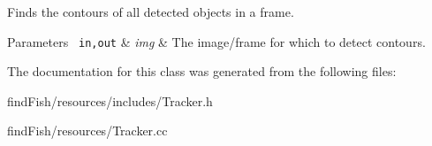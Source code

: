 Finds the contours of all detected objects in a frame. 
\begin{DoxyParams}[1]{Parameters}
\mbox{\texttt{ in,out}}  & {\em img} & The image/frame for which to detect contours. \\
\hline
\end{DoxyParams}


The documentation for this class was generated from the following files\+:\begin{DoxyCompactItemize}
\item 
find\+Fish/resources/includes/Tracker.\+h\item 
find\+Fish/resources/Tracker.\+cc\end{DoxyCompactItemize}
